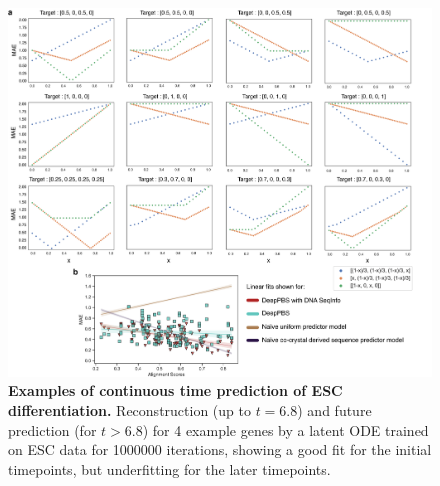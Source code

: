 \begin{center}
\begin{figure}[H]
  \includegraphics[width=\linewidth]{./pdnafigs/figS10.png}
    \caption[Examples of continuous time prediction of ESC differentiation.]{\textbf{Examples of continuous time prediction of ESC differentiation.} Reconstruction (up to $t=6.8$) and future prediction (for $t>6.8$) for 4 example genes by a  latent ODE \citep{chen2018neural} trained on ESC data \citep{Klein2015} for 1000000 iterations, showing a good fit for the initial timepoints, but underfitting for the later timepoints.}
  \label{fig:pdnaS10}
\end{figure}
\end{center}

